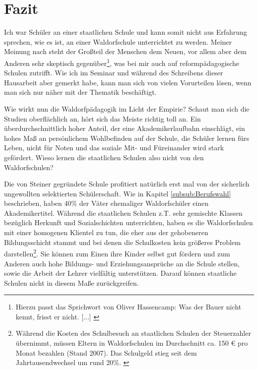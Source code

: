 \section{Fazit}

Ich war Schüler an einer staatlichen Schule und kann somit nicht aus Erfahrung sprechen, wie es ist, an einer Waldorfschule unterrichtet zu werden. Meiner Meinung nach steht der Großteil der Menschen dem Neuen, vor allem aber dem Anderen sehr skeptisch gegenüber\footnote{Hierzu passt das Sprichwort von Oliver Hassencamp: Was der Bauer nicht kennt, frisst er nicht. [...] \citep[Vgl.][]{roschk13}}, was bei mir auch auf reformpädagogische Schulen zutrifft. Wie ich im Seminar und während des Schreibens dieser Hausarbeit aber  gemerkt habe, kann man sich von vielen Vorurteilen lösen, wenn man sich nur näher mit der Thematik beschäftigt.

Wie wirkt nun die Waldorfpädagogik im Licht der Empirie? Schaut man sich die Studien oberflächlich an, hört sich das Meiste richtig toll an. Ein überdurchschnittlich hoher Anteil, der eine Akademikerlaufbahn einschlägt, ein hohes Maß an persönlichem Wohlbefinden auf der Schule, die Schüler lernen fürs Leben, nicht für Noten und das soziale Mit- und Füreinander wird stark gefördert. Wieso lernen die staatlichen Schulen also nicht von den Waldorfschulen?


Die von Steiner gegründete Schule profitiert natürlich erst mal von der sicherlich ungewollten selektierten Schülerschaft. Wie in Kapitel \ref{subsub:Berufswahl} beschrieben, haben 40\% der Väter ehemaliger Waldorfschüler einen Akademikertitel. Während die staatlichen Schulen z.T. sehr gemischte Klassen bezüglich Herkunft und Sozialschichten unterrichten, haben es die Waldorfschulen mit einer homogenen Klientel zu tun, die eher aus der gehobeneren Bildungsschicht stammt und bei denen die Schulkosten kein größeres Problem darstellen\footnote{Während die Kosten des Schulbesuch an staatlichen Schulen der Steuerzahler übernimmt, müssen Eltern in Waldorfschulen im Durchschnitt ca. 150 € pro Monat bezahlen (Stand 2007). Das Schulgeld stieg seit dem Jahrtausendwechsel um rund 20\%. \citep[Vgl.][]{mannheim09}}. Sie können zum Einen ihre Kinder selbst gut fördern und zum Anderen auch hohe Bildungs- und Erziehungsansprüche an die Schule stellen, sowie die Arbeit der Lehrer vielfältig unterstützen. Darauf können staatliche Schulen nicht in diesem Maße zurückgreifen. 

